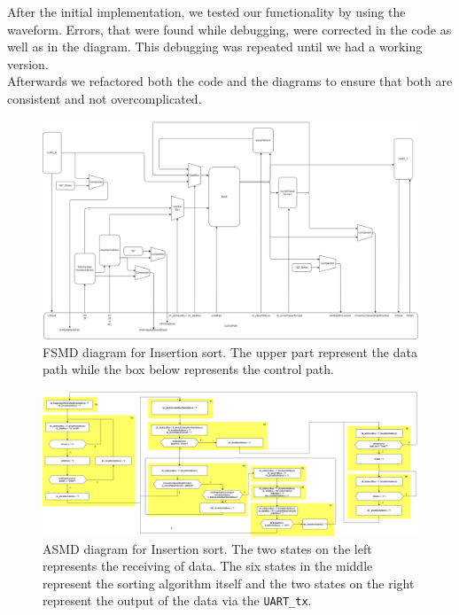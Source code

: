 \documentclass[conference]{IEEEtran}
\begin{document}
After the initial implementation, we tested our functionality by using the waveform. Errors, that were found while debugging, were corrected in the code as well as in the diagram. This debugging was repeated until we had a working version.\\
Afterwards we refactored both the code and the diagrams to ensure that both are consistent and not overcomplicated. 
\begin{figure}
    \centering
    \includegraphics[width=1\linewidth]{Images/FSMDInsertionSort.png}
    \caption{FSMD diagram for Insertion sort. The upper part represent the data path while the box below represents the control path.}
    \label{fig:fsmd}
\end{figure}
\begin{figure}
    \centering
    \includegraphics[width=1\linewidth]{Images/ASMDInsertionSort.png}
    \caption{ASMD diagram for Insertion sort. The two states on the left represents the receiving of data. The six states in the middle represent the sorting algorithm itself and the two states on the right represent the output of the data via the \texttt{UART\_tx}.}
    \label{fig:asmd}
\end{figure}
\end{document}
